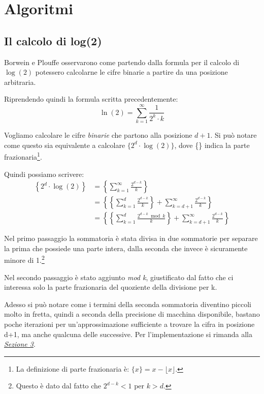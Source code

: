 \section{Algoritmi}

\subsection{Il calcolo di log(2)}
Borwein e Plouffe osservarono come partendo dalla formula per il calcolo di $\log(2)$ potessero calcolarne le cifre binarie a partire da una posizione arbitraria.

\noindent Riprendendo quindi la formula scritta precedentemente:
$$\ln(2) = \sum\limits_{k=1}^{\infty} \frac{1}{2^k \cdot k}$$

\noindent Vogliamo calcolare le cifre \textit{binarie} che partono alla posizione $d+1$. Si può notare come questo sia equivalente a calcolare $\{2^d \cdot \log(2)\}$, dove \{\} indica la parte frazionaria\footnote{La definizione di parte frazionaria è: $\{x\} = x - \lfloor x \rfloor$.}.

Quindi possiamo scrivere:
\begin{equation*}
\begin{split}
\left\{2^d \cdot \log(2)\right\}
& = \left\{ \sum\limits_{k=1}^{\infty} \frac{2^{d-k}}{k} \right\} \\
& = \left\{ \left\{ \sum\limits_{k=1}^{d} \frac{2^{d-k}}{k} \right\} + \sum\limits_{k=d+1}^{\infty} \frac{2^{d-k}}{k} \right\} \\
& = \left\{ \left\{ \sum\limits_{k=1}^{d} \frac{2^{d-k}\bmod k}{k} \right\} + \sum\limits_{k=d+1}^{\infty} \frac{2^{d-k}}{k} \right\}
\end{split}
\end{equation*}

Nel primo passaggio la sommatoria è stata divisa in due sommatorie per separare la prima che possiede una parte intera, dalla seconda che invece è sicuramente minore di 1.\footnote{Questo è dato dal fatto che $2^{d-k} < 1$ per $k > d$.}

Nel secondo passaggio è stato aggiunto \textit{mod k}, giustificato dal fatto che ci interessa solo la parte frazionaria del quoziente della divisione per k.

Adesso si può notare come i termini della seconda sommatoria diventino piccoli molto in fretta, quindi a seconda della precisione di macchina disponibile, bastano poche iterazioni per un'approssimazione sufficiente a trovare la cifra in posizione d+1, ma anche qualcuna delle successive.
\bigbreak \noindent
Per l'implementazione si rimanda alla \hyperref[sec:impl]{\textit{Sezione 3}}.


